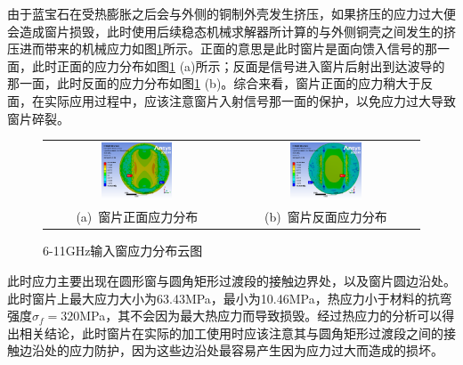 \documentclass[master]{thesis-uestc}
\begin{document}
由于蓝宝石在受热膨胀之后会与外侧的铜制外壳发生挤压，如果挤压的应力过大便会造成窗片损毁，此时使用后续稳态机械求解器所计算的与外侧铜壳之间发生的挤压进而带来的机械应力如图\ref{fig:X输入应力分布}所示。正面的意思是此时窗片是面向馈入信号的那一面，此时正面的应力分布如图\ref{fig:X输入应力分布} (a)所示；反面是信号进入窗片后射出到达波导的那一面，此时反面的应力分布如图\ref{fig:X输入应力分布} (b)。综合来看，窗片正面的应力稍大于反面，在实际应用过程中，应该注意窗片入射信号那一面的保护，以免应力过大导致窗片碎裂。
\begin{figure}[!htb]
    \small
    \centering
    \begin{tabular}{@{\ }c@{\ }c}
        \includegraphics[width=0.4\textwidth]{pic/chapter3/窗片正面应力分布.png} & 
        \hspace{5pt}
        \includegraphics[width=0.4\textwidth]{pic/chapter3/窗片反面应力分布.png}     \\
        \mbox{\small (a) 窗片正面应力分布}                                                                               & 
        \mbox{\small (b) 窗片反面应力分布}                                                                                  \\
    \end{tabular}
    \caption{6-11GHz输入窗应力分布云图}
    \label{fig:X输入应力分布}
\end{figure}

此时应力主要出现在圆形窗与圆角矩形过渡段的接触边界处，以及窗片圆边沿处。此时窗片上最大应力大小为63.43MPa，最小为10.46MPa，热应力小于材料的抗弯强度\(\sigma_f = 320\)MPa，其不会因为最大热应力而导致损毁。经过热应力的分析可以得出相关结论，此时窗片在实际的加工使用时应该注意其与圆角矩形过渡段之间的接触边沿处的应力防护，因为这些边沿处最容易产生因为应力过大而造成的损坏。
\end{document}
